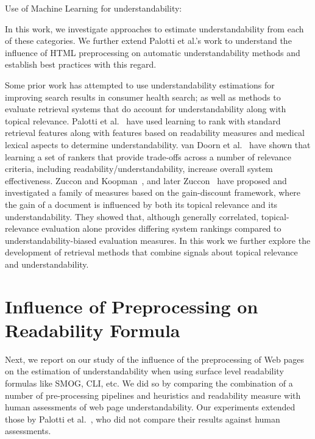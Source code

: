 Use of Machine Learning for understandability: 

In this work, we investigate approaches to estimate understandability from each of these categories. We further extend Palotti et al.'s work to understand the influence of HTML preprocessing on automatic understandability methods and establish best practices with this regard. 

Some prior work has attempted to use understandability estimations for improving search results in consumer health search; as well as methods to evaluate retrieval systems that do account for understandability along with topical relevance. Palotti et al.~\cite{palotti2016ranking} have used learning to rank with standard retrieval features along with features based on readability measures and medical lexical aspects to determine
understandability. van Doorn et al.~\cite{van2016balancing} have shown that learning a set of rankers that provide trade-offs across a number of relevance criteria, including readability/understandability, increase overall system effectiveness.   
Zuccon and Koopman~\cite{zuccon14}, and later Zuccon~\cite{zuccon2016understandability} have proposed and investigated a family of measures based on the gain-discount framework, where the gain of a document is influenced by both its topical relevance and its understandability. They showed that, although generally correlated, topical-relevance evaluation alone provides differing system rankings compared to understandability-biased evaluation measures. 
In this work we further explore the development of retrieval methods that combine signals about topical relevance and understandability. 


\section{Influence of Preprocessing on Readability Formula}
\label{sec:which_readability}

Next, we report on our study of the influence of the preprocessing of Web pages on the estimation of understandability when using surface level readability formulas like SMOG, CLI, etc. We did so by comparing the combination of a number of pre-processing pipelines and heuristics and readability measure with human assessments of web page understandability. 
Our experiments extended those by Palotti et al.~\cite{palotti15}, who did not compare their results against human assessments. 

